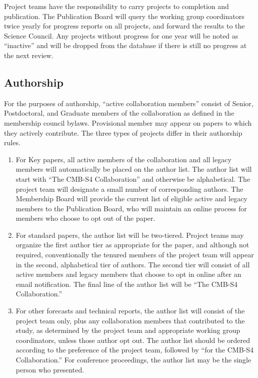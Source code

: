 Project teams have the responsibility to carry projects to completion and publication.  The Publication Board will query the working group coordinators twice yearly for progress reports on all projects, and forward the results to the Science Council.  Any projects without progress for one year will be noted as ``inactive'' and will be dropped from the database if there is still no progress at the next review.

\subsection{Authorship}

For the purposes of authorship, ``active collaboration members'' consist of Senior, Postdoctoral, and Graduate members of the collaboration as defined in the membership council bylaws.  Provisional member may appear on papers to which they actively contribute.  The three types of projects differ in their authorship rules.

\begin{enumerate}
\item For Key papers, all active members of the collaboration and all legacy members will automatically be placed on the author list.  The author list will start with ``The CMB-S4 Collaboration'' and otherwise be alphabetical.  The project team will designate a small number of corresponding authors.  The Membership Board will provide the current list of eligible active and legacy members to the Publication Board, who will maintain an online process for members who choose to opt out of the paper.
\item For standard papers, the author list will be two-tiered.
  Project teams may organize the first author tier as appropriate for the paper, and although not required, conventionally the tenured members of the project team will appear in the second, alphabetical tier of authors.
  The second tier will consist of all active members and legacy members that choose to opt in online after an email notification.  The final line of the author list will be ``The CMB-S4 Collaboration.''
  \item For other forecasts and technical reports, the author list will consist of the project team only, plus any collaboration members that contributed to the study, as determined by the project team and appropriate working group coordinators, unless those author opt out.  The author list should be ordered according to the preference of the project team, followed by ``for the CMB-S4 Collaboration.''  For conference proceedings, the author list may be the single person who presented.
\end{enumerate}


